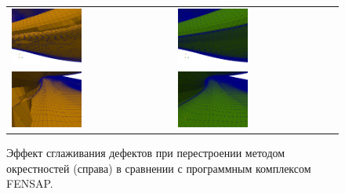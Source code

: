 \documentclass[a4paper,14pt]{extarticle}                     %
\theoremstyle{plain}                                         %
\begin{document}
\begin{figure}[!ht]
\centering
\begin{tabular}{ll}
\includegraphics[width=0.45\textwidth]{pics/text_1_remesh_3d/fens1.png}
&
\includegraphics[width=0.45\textwidth]{pics/text_1_remesh_3d/crys1.png} \\
\includegraphics[width=0.45\textwidth]{pics/text_1_remesh_3d/fens2.png}
&
\includegraphics[width=0.45\textwidth]{pics/text_1_remesh_3d/crys2.png}
\end{tabular}
\singlespacing
\caption{Эффект сглаживания дефектов при перестроении методом окрестностей (справа) в сравнении с программным комплексом FENSAP.}
\label{fig:text_1_remesh3_with_fensap}
\end{figure}
\end{document}
